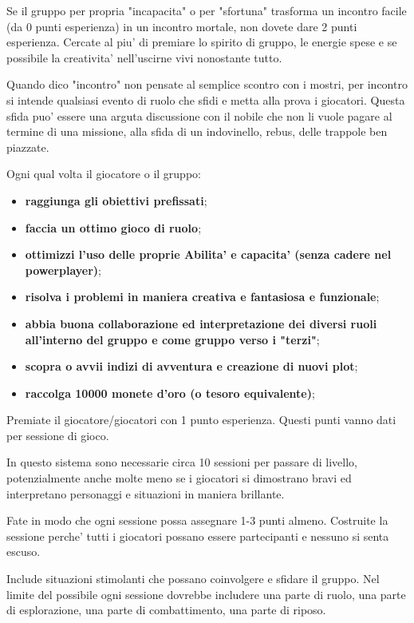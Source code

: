 \documentclass[a4paper,11pt,twoside,openany]{book}
\begin{document}
{Se il gruppo per propria "incapacita" o per "sfortuna" trasforma un incontro facile (da 0 punti esperienza) in un incontro mortale, non dovete dare 2 punti esperienza. Cercate al piu' di premiare lo spirito di gruppo, le energie spese e se possibile la creativita' nell'uscirne vivi  nonostante tutto.

Quando dico "incontro" non pensate al semplice scontro con i mostri, per incontro si intende qualsiasi evento di ruolo che sfidi e metta alla prova i giocatori. Questa sfida puo' essere una arguta discussione con il nobile che non li vuole pagare al termine di una missione, alla sfida di un indovinello, rebus, delle trappole ben piazzate.

\bigskip

Ogni qual volta il giocatore o il gruppo:
\begin{itemize}
\item 
\textbf{raggiunga gli obiettivi prefissati}; 
\item 
\textbf{faccia un ottimo gioco di ruolo}; 
\item 
\textbf{ottimizzi l'uso delle proprie Abilita' e capacita' (senza cadere nel powerplayer)}; 
\item 
\textbf{risolva i problemi in maniera creativa e fantasiosa e funzionale}; 
\item 
\textbf{abbia buona collaborazione ed interpretazione dei diversi ruoli all'interno del gruppo e come gruppo verso i "terzi"}; 
\item 
\textbf{scopra o avvii indizi di avventura e creazione di nuovi plot};
\item
\textbf{raccolga 10000 monete d'oro (o tesoro equivalente)};
\end{itemize}

\bigskip

Premiate il giocatore/giocatori con 1 punto esperienza. Questi punti vanno dati per sessione di gioco.

In questo sistema sono necessarie circa 10 sessioni per passare di livello, potenzialmente anche molte meno se i giocatori si dimostrano bravi ed interpretano personaggi e situazioni in maniera brillante. 

Fate in modo che ogni sessione possa assegnare 1-3 punti almeno. Costruite la sessione perche' tutti i giocatori possano essere partecipanti e nessuno si senta escuso.

Include situazioni stimolanti che possano coinvolgere e sfidare il gruppo.
Nel limite del possibile ogni sessione dovrebbe includere una parte di ruolo, una parte di esplorazione, una parte di combattimento, una parte di riposo.

}
\end{document}
